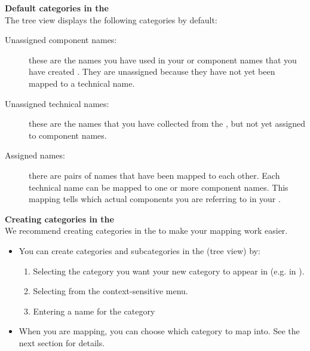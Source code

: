 
\textbf{Default categories in the \gdomeditor{}}\\
\label{TasksOMDefaultCats}
The \gdomeditor{} tree view displays the following categories by default:
\begin{description}
\item [Unassigned component names:]{these are the names you have used in your \gdcases{} or component names that you have created . They are unassigned because they have not yet been mapped to a technical name. }
\item [Unassigned technical names:]{these are the names that you have collected from the \gdaut{} , but not yet assigned to component names. }
\item [Assigned names:]{there are pairs of names that have been mapped to each other. Each technical name can be mapped to one or more component names. This mapping tells \app{} which actual components you are referring to in your \gdcases{}.}
\end{description}

\textbf{Creating categories in the \gdomeditor{}}\\
\label{omcats}
We recommend creating categories in the \gdomeditor{} to make your mapping work easier. 
\begin{itemize}
\item You can create categories and subcategories in the \gdomeditor{} (tree view) by:
\begin{enumerate}
\item Selecting the category you want your new category to appear in (e.g. in ).
\item Selecting  from the context-sensitive menu. 
\item Entering a name for the category
\end{enumerate}
\item When you are mapping, you can choose which category to map into. See the next section  for details.
\end{itemize}


